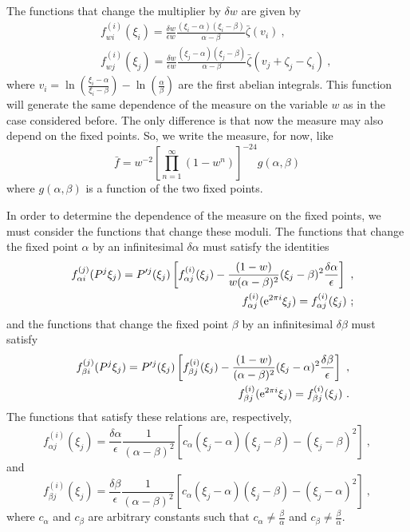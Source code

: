 \documentclass[a4paper,12pt]{article}
\begin{document}
The functions that change the multiplier by $\delta w$ are given by
\begin{eqnarray}
 & & f_{wi}^{(i)}(\xi _i)=\frac{\delta w}{\epsilon w}\frac{(\xi _i-\alpha )(\xi _i-\beta )}{\alpha -\beta }\bar \zeta (v_i)\ ,\\ 
 & & f_{wj}^{(i)}(\xi _j)=\frac{\delta w}{\epsilon w}\frac{(\xi _j-\alpha )(\xi _j-\beta )}{\alpha -\beta }\bar \zeta (v_j+\zeta _j-\zeta _i)\ ,
\end{eqnarray}
where $v_i=\ln \left( \frac{\xi _i-\alpha }{\xi _i-\beta }\right) -\ln \left( \frac{\alpha }{\beta }\right) $ are the first abelian integrals. This function will generate the same dependence of the measure on the variable $w$ as in the case considered before. The only difference is that now the measure may also depend on the fixed points. So, we write the measure, for now, like
\begin{equation}
\label{eq19}
\bar f=w^{-2}\left[ \prod_{n=1}^\infty (1-w^n)\right] ^{-24}g(\alpha ,\beta )
\end{equation}
where $g(\alpha ,\beta )$ is a function of the two fixed points.

In order to determine the dependence of the measure on the fixed points, we must consider the functions that change these moduli. The functions that change the fixed point $\alpha $ by an infinitesimal $\delta \alpha $ must satisfy the identities
\begin{eqnarray}
 & & f_{\alpha i}^{(j)}(P^j\xi _j)=P'^j(\xi _j)\left[ f_{\alpha j}^{(i)}(\xi _j)-\frac{(1-w)}{w(\alpha -\beta )^2}(\xi _j-\beta )^2\frac{\delta \alpha }{\epsilon }\right] \ ,\\ 
 & & f_{\alpha j}^{(i)}({\rm e}^{2\pi i}\xi _j)=f_{\alpha j}^{(i)}(\xi _j)\ ;
\end{eqnarray}
and the functions that change the fixed point $\beta $ by an infinitesimal $\delta \beta $ must satisfy
\begin{eqnarray}
 & & f_{\beta i}^{(j)}(P^j\xi _j)=P'^j(\xi _j)\left[ f_{\beta j}^{(i)}(\xi _j)-\frac{(1-w)}{(\alpha -\beta )^2}(\xi _j-\alpha )^2\frac{\delta \beta }{\epsilon }\right] \ ,\\ 
 & & f_{\beta j}^{(i)}({\rm e}^{2\pi i}\xi _j)=f_{\beta j}^{(i)}(\xi _j)\ .
\end{eqnarray}
The functions that satisfy these relations are, respectively,
\begin{equation}
f_{\alpha j}^{(i)}(\xi _j)=\frac{\delta \alpha }{\epsilon }\frac{1}{(\alpha -\beta )^2}\left[ c_\alpha (\xi _j-\alpha )(\xi _j-\beta )-(\xi _j-\beta )^2\right] \ ,
\end{equation}
and
\begin{equation}
f_{\beta j}^{(i)}(\xi _j)=\frac{\delta \beta }{\epsilon }\frac{1}{(\alpha -\beta )^2}\left[ c_\alpha (\xi _j-\alpha )(\xi _j-\beta )-(\xi _j-\alpha )^2\right] \ ,
\end{equation}
where $c_\alpha $ and $c_\beta $ are arbitrary constants such that $c_\alpha \neq \frac{\beta }{\alpha }$ and $c_\beta \neq \frac{\beta }{\alpha }$.
\end{document}
